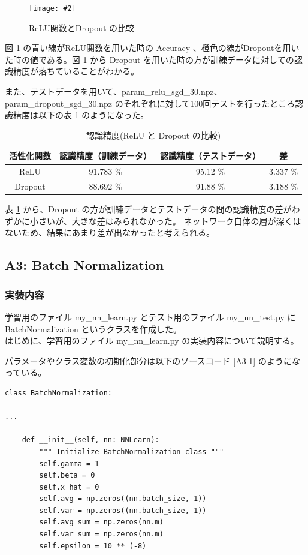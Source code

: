 \documentclass[a4paper,dvipdfmx]{jsarticle}
\newcommand{\image}[3]{
    \begin{figure}[H]
        \begin{center}
        \texttt{[image: \#2]}
        \end{center}
        \caption{#1}
        \label{#3}
    \end{figure}
}
\begin{document}
\image{ReLU関数とDropout の比較}{report_a2-1.png}{fig-A-2-1}

図 \ref{fig-A-2-1} の青い線がReLU関数を用いた時の Accuracy 、橙色の線がDropoutを用いた時の値である。図 \ref{fig-A-2-1} から Dropout を用いた時の方が訓練データに対しての認識精度が落ちていることがわかる。

また、テストデータを用いて、param\_relu\_sgd\_30.npz、param\_dropout\_sgd\_30.npz のそれぞれに対して100回テストを行ったところ認識精度は以下の表 \ref{table-A2-1} のようになった。

\begin{table}[H]
\begin{center}
\caption{認識精度(ReLU と Dropout の比較)}
  \begin{tabular}{|c|c|c|c|} \hline
    活性化関数 & 認識精度（訓練データ） & 認識精度（テストデータ）& 差  \\ \hline \hline
    ReLU & 91.783 \% & 95.12 \% & 3.337 \% \\ \hline
    Dropout & 88.692 \% & 91.88 \% &  3.188 \% \\ \hline
  \end{tabular}
	\label{table-A2-1}
\end{center}
\end{table}

表 \ref{table-A2-1} から、Dropout の方が訓練データとテストデータの間の認識精度の差がわずかに小さいが、大きな差はみられなかった。
ネットワーク自体の層が深くはないため、結果にあまり差が出なかったと考えられる。
 
 \subsection*{A3: Batch Normalization}
 
 \subsubsection*{実装内容}
 
 学習用のファイル my\_nn\_learn.py とテスト用のファイル my\_nn\_test.py に BatchNormalization というクラスを作成した。\\
 
 はじめに、学習用のファイル my\_nn\_learn.py の実装内容について説明する。
 
 パラメータやクラス変数の初期化部分は以下のソースコード \ref{A3-1} のようになっている。
 \begin{lstlisting}[caption="Batch Normalization (学習用: 初期化)",label=A3-1]
 class BatchNormalization:

...

    def __init__(self, nn: NNLearn):
        """ Initialize BatchNormalization class """
        self.gamma = 1
        self.beta = 0
        self.x_hat = 0
        self.avg = np.zeros((nn.batch_size, 1))
        self.var = np.zeros((nn.batch_size, 1))
        self.avg_sum = np.zeros(nn.m)
        self.var_sum = np.zeros(nn.m)
        self.epsilon = 10 ** (-8)
\end{lstlisting}
\end{document}
